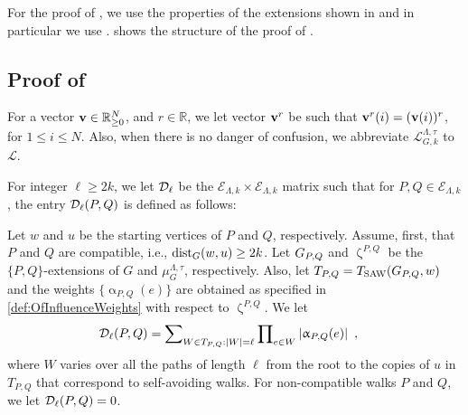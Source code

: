 \documentclass[11pt,reqno]{amsart}
\numberwithin{equation}{section}
\newcommand{\cE}{{\mathcal{E}}}
\newcommand{\cL}{{\mathcal{L}}}
\newcommand{\applegreen}[1]{ {\color{applegreen}#1}}
\newcommand{\amethyst}[1]{{\color{amethyst}#1} }
\newcommand{\blue}[1]{{\color{blue}#1}}
\newcommand{\bluepigment}[1]{{\color{blue(pigment)}#1}}
\newcommand{\byzantine}[1]{{\color{byzantine}#1}}
\newcommand{\bostonuniversityred}[1]{{\color{bostonuniversityred}#1}}
\newcommand{\capri}[1]{{\color{capri}#1}}
\newcommand{\cadmiumgreen}[1]{{\color{cadmiumgreen}#1}}
\newcommand{\goldenbrown}[1]{{\color{goldenbrown}#1}}
\newcommand{\iris}[1]{{\color{iris}#1}}
\newcommand{\red}[1]{{\color{red}#1}}
\newcommand{\rosegold}[1]{{\color{rosegold}#1}}
\newcommand{\dist}{{\rm dist}}
\newcommand{\ExtV}{\iris{\cE}}
\newcommand{\Tsaw}{T_{\rm SAW}}
\newcommand{\abs}[1]{\blue{|}#1\blue{|}}
\renewcommand{\applegreen}[1]{#1}
\renewcommand{\amethyst}[1]{#1}
\renewcommand{\blue}[1]{#1}
\renewcommand{\bluepigment}[1]{#1}
\renewcommand{\byzantine}[1]{#1}
\renewcommand{\bostonuniversityred}[1]{#1}
\renewcommand{\capri}[1]{#1}
\renewcommand{\cadmiumgreen}[1]{#1}
\renewcommand{\goldenbrown}[1]{#1}
\renewcommand{\iris}[1]{#1}
\renewcommand{\red}[1]{#1}
\renewcommand{\rosegold}[1]{#1}
\newcommand{\ke}{\blue{e}}
\newcommand{\ki}{\capri{i}}
\newcommand{\kk}{\bluepigment{k}}
\newcommand{\kell}{{\color{green(pigment)}\ell}}%
\newcommand{\kP}{\goldenbrown{P}}
\newcommand{\kQ}{\amethyst{Q}}
\newcommand{\kr}{\bostonuniversityred{r}}%
\newcommand{\ku}{\red{u}}
\newcommand{\kW}{\blue{W}}
\newcommand{\kw}{\blue{w}}
\renewcommand{\ke}{e}
\renewcommand{\ki}{i}
\renewcommand{\kk}{k}
\renewcommand{\kell}{\ell}
\renewcommand{\kP}{P}
\renewcommand{\kQ}{Q}
\renewcommand{\kr}{r}
\renewcommand{\ku}{u}
\renewcommand{\kW}{W}
\renewcommand{\kw}{w}
\newcommand{\ExtdInfMatrix}{\rosegold{\cL}}
\newcommand{\ExtdInfMatrixF}{\applegreen{\cL}^{\Lambda,\tau}_{G,\kk}}
\newcommand{\infweight}{\upalpha}
\begin{document}
For the proof of ,  we use the properties of the extensions shown in  
and in particular we use .
%
 shows the structure of the proof of .





\newcommand{\TPQ}{ \cadmiumgreen{T_{\kP,\kQ}} }
\newcommand{\TPP}{ \byzantine{\overline{T}}}
\newcommand{\TAdj}{\red{\UpZ}}


\newcommand{\vecF}{\upf}
\newcommand{\vecG}{\upg}
\newcommand{\vecK}{\upk}
\newcommand{\vtest}{\iris{{\bf q}}}




\subsection{Proof of }\label{sec:thrm:InfNormBoundHConj}
% 
For a vector ${\bf v}\in \mathbb{R}^{N}_{\geq 0}$,  and $\kr \in \mathbb{R}$, we let vector ${\bf v}^{\kr}$ be such 
that ${\bf v}^{\kr}(\ki)=({\bf v}(\ki))^{\kr}$, for $1\leq \ki \leq  N$.  Also, when there is no danger of confusion, we abbreviate $\ExtdInfMatrixF$ to $\ExtdInfMatrix$.


For integer $\kell\geq 2\kk$, we let $\ExtdInfMatrixL_{\kell}$ be the $\ExtV_{\Lambda,\kk}\times \ExtV_{\Lambda,\kk}$ matrix 
such that for $\kP,\kQ \in \ExtV_{\Lambda,\kk}$,  the entry $\ExtdInfMatrixL_{\kell}(\kP,\kQ)$ is defined as follows: 


Let $\kw$ and $\ku$ be the starting vertices of $\kP$ and $\kQ$, respectively.
%
Assume, first, that $\kP$ and $\kQ$ are compatible, i.e., $\dist_G(\kw,\ku)\geq 2\kk$.  Let $\gext{G}{\kP,\kQ}$ 
and $\upzeta^{\kP,\kQ}$ be the $\{\kP,\kQ\}$-extensions of $G$ and  $\mu^{\Lambda,\tau}_G$, respectively.  
Also, let $\TPQ=\Tsaw(G_{\kP,\kQ}, \kw)$ and the weights $\{ \infweight_{\kP,\kQ}(\ke)\}$ are obtained as  specified  
in \eqref{def:OfInfluenceWeights} with respect to $\upzeta^{\kP,\kQ}$.  We let
\begin{align}\nonumber
\ExtdInfMatrixL_{\kell}(\kP, \kQ) &=\sum\nolimits_{\kW\in \TPQ: \abs{\kW}=\kell} \prod\nolimits_{\ke\in \kW} \abs{\infweight_{\kP,\kQ}(\ke)} \enspace, 
\end{align}
where $\kW$ varies over all the paths of length $\kell$ from the root to the copies of $\ku$ in $\TPQ$ that correspond to
self-avoiding walks.   For non-compatible walks $\kP$ and $\kQ$, we let  $\ExtdInfMatrixL_{\kell}(\kP, \kQ) =0$. 
\end{document}
